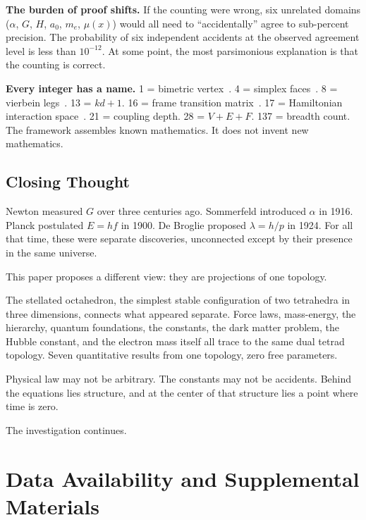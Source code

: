 \documentclass[aps,prd,preprint,superscriptaddress,showpacs,preprintnumbers,amsmath,amssymb,nofootinbib]{revtex4-2}
\begin{document}
\textbf{The burden of proof shifts.} If the counting were wrong, six unrelated domains ($\alpha$, $G$, $H$, $a_0$, $m_e$, $\mu(x)$) would all need to ``accidentally'' agree to sub-percent precision. The probability of six independent accidents at the observed agreement level is less than $10^{-12}$. At some point, the most parsimonious explanation is that the counting is correct.

\textbf{Every integer has a name.} 1 = bimetric vertex~\cite{hinterbichler2012}. 4 = simplex faces~\cite{ziegler1995}. 8 = vierbein legs~\cite{barbieri1998}. 13 = $kd + 1$. 16 = frame transition matrix~\cite{hassan2012}. 17 = Hamiltonian interaction space~\cite{hassankocic2018}. 21 = coupling depth. 28 = $V + E + F$. 137 = breadth count. The framework assembles known mathematics. It does not invent new mathematics.

\subsection{Closing Thought}
\label{subsec:closing}

Newton measured $G$ over three centuries ago. Sommerfeld introduced $\alpha$ in 1916. Planck postulated $E = hf$ in 1900. De Broglie proposed $\lambda = h/p$ in 1924. For all that time, these were separate discoveries, unconnected except by their presence in the same universe.

This paper proposes a different view: they are projections of one topology.

The stellated octahedron, the simplest stable configuration of two tetrahedra in three dimensions, connects what appeared separate. Force laws, mass-energy, the hierarchy, quantum foundations, the constants, the dark matter problem, the Hubble constant, and the electron mass itself all trace to the same dual tetrad topology. Seven quantitative results from one topology, zero free parameters.

Physical law may not be arbitrary. The constants may not be accidents. Behind the equations lies structure, and at the center of that structure lies a point where time is zero.

The investigation continues.

\section*{Data Availability and Supplemental Materials}
\end{document}
